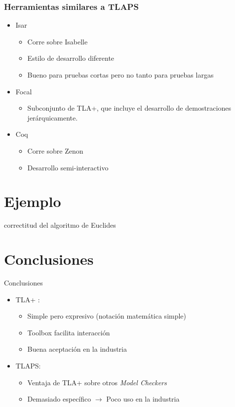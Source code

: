 \documentclass[12pt]{beamer}
\newenvironment{stepitemize}{\begin{itemize}[<+->]}{\end{itemize} }
\begin{document}
\begin{frame}

  \frametitle{Herramientas similares a TLAPS}
  \begin{stepitemize}
	  \item Isar
	  \begin{itemize}
	    \item Corre sobre Isabelle
	    \item Estilo de desarrollo diferente
	    \item Bueno para pruebas cortas pero no tanto para pruebas largas
	   \end{itemize}
	   \item Focal
	    \begin{itemize}
	     \item Subconjunto de TLA+, que incluye el desarrollo de demostraciones jerárquicamente. 
	    \end{itemize}
	   \item Coq
	   \begin{itemize}
	    \item Corre sobre Zenon
	    \item Desarrollo semi-interactivo
	   \end{itemize}

	    

  \end{stepitemize}


\end{frame}

\section{Ejemplo}
\begin{frame}
correctitud del algoritmo de Euclides
\end{frame}

\section{Conclusiones}
\begin{frame}{Conclusiones}
  \begin{stepitemize}
  \item TLA+ : 
  	   \begin{itemize}
	    \item Simple pero expresivo (notación matemática simple)
	    \item Toolbox facilita interacción
	    \item Buena aceptación en la industria
	   \end{itemize}
  \item TLAPS: 
    	   \begin{itemize}
	    \item Ventaja de TLA+ sobre otros \textit{Model Checkers}
	    \item Demasiado específico $\rightarrow$ Poco uso en la industria
	   \end{itemize}
  \end{stepitemize}
\end{frame}
\end{document}
